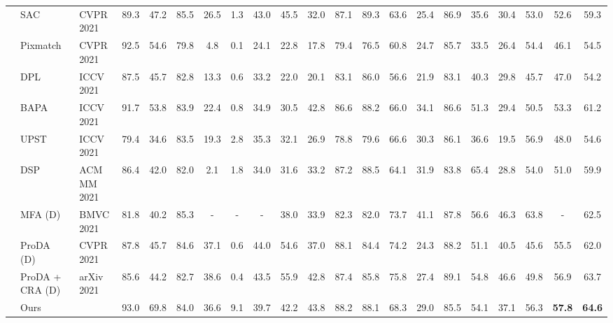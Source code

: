 \documentclass[sigconf]{acmart}
\begin{document}
\begin{table*}[h]
\begin{center}
\begin{tabular}{lll|cccccccccccccccc|c|c}
				
				&  SAC~\cite{araslanov2021self}  & CVPR 2021   &  89.3 & 47.2 & 85.5 & 26.5 & 1.3 & 43.0 & 45.5 & 32.0 & 87.1 & 89.3 & 63.6 & 25.4 & 86.9 & 35.6 & 30.4 & 53.0 & 52.6 & 59.3 \\
&  Pixmatch~\cite{melas2021pixmatch} & CVPR 2021 & 92.5 & 54.6 & 79.8 & 4.8 & 0.1 & 24.1 & 22.8 & 17.8 & 79.4 & 76.5 & 60.8 & 24.7 & 85.7 & 33.5 & 26.4 & 54.4 & 46.1 & 54.5 \\
				& DPL~\cite{cheng2021dual} & ICCV 2021 & 87.5 & 45.7 & 82.8 & 13.3 & 0.6 & 33.2 & 22.0 & 20.1 & 83.1 & 86.0 & 56.6 & 21.9 & 83.1 & 40.3 & 29.8 & 45.7 & 47.0 & 54.2 \\
				& BAPA~\cite{liu2021bapa} & ICCV 2021 & 91.7 & 53.8 & 83.9 & 22.4 & 0.8 & 34.9 & 30.5 & 42.8 & 86.6 & 88.2 & 66.0 & 34.1 & 86.6 & 51.3 & 29.4 & 50.5 & 53.3 & 61.2 \\
				& UPST~\cite{wang2021uncertainty} & ICCV 2021 & 79.4 & 34.6 & 83.5 & 19.3 & 2.8 & 35.3 & 32.1 & 26.9 & 78.8 & 79.6 & 66.6 & 30.3 & 86.1 & 36.6 & 19.5 & 56.9 & 48.0 & 54.6 \\
				
				
				
				& DSP~\cite{gao2021dsp}  & ACM MM 2021  & 86.4 & 42.0 & 82.0 & 2.1 & 1.8 & 34.0 & 31.6 & 33.2 & 87.2 & 88.5 & 64.1 & 31.9 & 83.8 & 65.4 & 28.8 & 54.0 & 51.0 & 59.9 \\
				
				
				
				
				\midrule 
				\midrule 
				&  MFA  (D)~\cite{zhang2021multiple} & BMVC 2021  & 81.8 & 40.2 & 85.3 & - & - & - & 38.0 & 33.9 & 82.3 & 82.0 & 73.7 & 41.1 & 87.8 & 56.6 & 46.3 & 63.8 & - & 62.5 \\
				
				& ProDA  (D)~\cite{zhang2021prototypical}  & CVPR 2021 & 87.8 & 45.7 & 84.6 & 37.1 & 0.6 & 44.0 & 54.6 & 37.0 & 88.1 & 84.4 & 74.2 & 24.3 & 88.2 & 51.1 & 40.5 & 45.6 & 55.5 & 62.0 \\
				
				& ProDA + CRA  (D)~\cite{wang2021cross} & arXiv 2021  & 85.6 & 44.2 & 82.7 & 38.6 & 0.4 & 43.5 & 55.9 & 42.8 & 87.4 & 85.8 & 75.8 & 27.4 & 89.1 & 54.8 & 46.6 & 49.8 & 56.9 & 63.7 \\
				
				\midrule \midrule 
				& Ours  &  & 93.0 & 69.8 & 84.0 & 36.6 & 9.1 & 39.7 & 42.2 & 43.8 & 88.2 & 88.1 & 68.3 & 29.0 & 85.5 & 54.1 & 37.1 & 56.3 & \bf 57.8 & \bf 64.6 \\
				
				\bottomrule
			\end{tabular}
			\vspace{8mm}
			\label{table:synthia}
		\end{center}  
	\end{table*}
	
\end{document}
